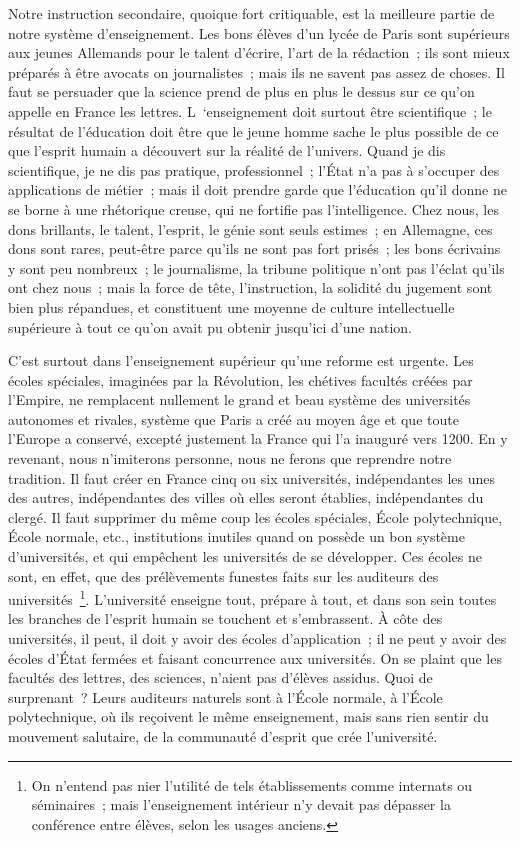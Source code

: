 \documentclass[french,twoside]{book} %
\begin{document}
Notre instruction secondaire, quoique fort critiquable, est la meilleure partie de notre système d’enseignement. Les bons élèves d’un lycée de Paris sont supérieurs aux jeunes Allemands pour le talent d’écrire, l’art de la rédaction ; ils sont mieux préparés à être avocats on journalistes ; mais ils ne savent pas assez de choses. Il faut se persuader que la science prend de plus en plus le dessus sur ce qu’on appelle en France les lettres. L ‘enseignement doit surtout être scientifique ; le résultat de l’éducation doit être que le jeune homme sache le plus possible de ce que l’esprit humain a découvert sur la réalité de l’univers. Quand je dis scientifique, je ne dis pas pratique, professionnel ; l’État n’a pas à s’occuper des applications de métier ; mais il doit prendre garde que l’éducation qu’il donne ne se borne à une rhétorique creuse, qui ne fortifie pas l’intelligence. Chez nous, les dons brillants, le talent, l’esprit, le génie sont seuls estimes ; en Allemagne, ces dons sont rares, peut-être parce qu’ils ne sont pas fort prisés ; les bons écrivains y sont peu nombreux ; le journalisme, la tribune politique n’ont pas l’éclat qu’ils ont chez nous ; mais la force de tête, l’instruction, la solidité du jugement sont bien plus répandues, et constituent une moyenne de culture intellectuelle supérieure à tout ce qu’on avait pu obtenir jusqu’ici d’une nation.\par
C’est surtout dans l’enseignement supérieur qu’une reforme est urgente. Les écoles spéciales, imaginées par la Révolution, les chétives facultés créées par l’Empire, ne remplacent nullement le grand et beau système des universités autonomes et rivales, système que Paris a créé au moyen âge et que toute l’Europe a conservé, excepté justement la France qui l’a inauguré vers 1200. En y revenant, nous n’imiterons personne, nous ne ferons que reprendre notre tradition. Il faut créer en France cinq ou six universités, indépendantes les unes des autres, indépendantes des villes où elles seront établies, indépendantes du clergé. Il faut supprimer du même coup les écoles spéciales, École polytechnique, École normale, etc., institutions inutiles quand on possède un bon système d’universités, et qui empêchent les universités de se développer. Ces écoles ne sont, en effet, que des prélèvements funestes faits sur les auditeurs des universités \footnote{On n’entend pas nier l’utilité de tels établissements comme internats ou séminaires ; mais l’enseignement intérieur n’y devait pas dépasser la conférence entre élèves, selon les usages anciens.}. L’université enseigne tout, prépare à tout, et dans son sein toutes les branches de l’esprit humain se touchent et s’embrassent. À côte des universités, il peut, il doit y avoir des écoles d’application ; il ne peut y avoir des écoles d’État fermées et faisant concurrence aux universités. On se plaint que les facultés des lettres, des sciences, n’aient pas d’élèves assidus. Quoi de surprenant ? Leurs auditeurs naturels sont à l’École normale, à l’École polytechnique, où ils reçoivent le même enseignement, mais sans rien sentir du mouvement salutaire, de la communauté d’esprit que crée l’université.\par
\end{document}
